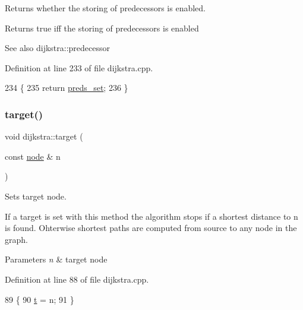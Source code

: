 Returns whether the storing of predecessors is enabled. 

\begin{DoxyReturn}{Returns}
{\ttfamily true} iff the storing of predecessors is enabled
\end{DoxyReturn}
\begin{DoxySeeAlso}{See also}
dijkstra\+::predecessor 
\end{DoxySeeAlso}


Definition at line 233 of file dijkstra.\+cpp.


\begin{DoxyCode}
234 \{
235     \textcolor{keywordflow}{return} \mbox{\hyperlink{classdijkstra_aaba530e703b5d4005b3c01fa1a11182d}{preds\_set}};
236 \}
\end{DoxyCode}
\mbox{\label{classdijkstra_a1e9971d767046306574551a461aa2238}} 
\subsubsection{\texorpdfstring{target()}{target()}\hspace{0.1cm}{\footnotesize\ttfamily [1/2]}}
{\footnotesize\ttfamily void dijkstra\+::target (\begin{DoxyParamCaption}\item[{const \mbox{\hyperlink{classnode}{node}} \&}]{n }\end{DoxyParamCaption})}



Sets target node. 

If a target is set with this method the algorithm stops if a shortest distance to {\ttfamily n} is found. Ohterwise shortest paths are computed from source to any node in the graph.


\begin{DoxyParams}{Parameters}
{\em n} & target node \\
\hline
\end{DoxyParams}


Definition at line 88 of file dijkstra.\+cpp.


\begin{DoxyCode}
89 \{
90     \mbox{\hyperlink{classdijkstra_a6c42e614aabfbef25b5acfb543fbe1d1}{t}} = n;
91 \}
\end{DoxyCode}
\mbox{\label{classdijkstra_a4957ef4369386ef2153359ea97da9d88}} 
